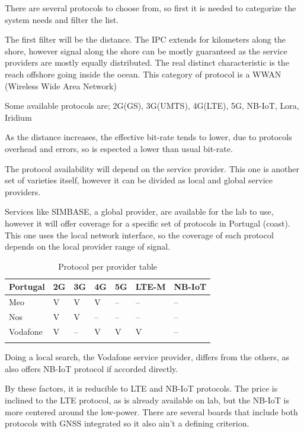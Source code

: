 There are several protocols to choose from, so first it is needed to categorize the 
system needs and filter the list.

The first filter will be the distance. The IPC extends for kilometers along the shore, 
however signal along the shore can be mostly guaranteed as the service providers are 
mostly equally distributed. The real distinct characteristic is the reach offshore 
going inside the ocean. This category of protocol is a WWAN (Wireless Wide Area Network)

Some available protocols are; 2G(GS), 3G(UMTS), 4G(LTE), 5G, NB-IoT, Lora, Iridium

As the distance increases, the effective bit-rate tends to lower, due to protocols 
overhead and errors, so is espected a lower than usual bit-rate.

The protocol availability will depend on the service provider. This one is another set of
varieties itself, however it can be divided as local and global service providers. 

Services like SIMBASE, a global provider, are available for the lab to use, however it will offer coverage for 
a specific set of protocols in Portugal (coast). This one uses the local network interface,
so the coverage of each protocol depends on the local provider range of signal.

\begin{table}[h!]
    \centering
    \begin{tabular}{l|l|l|l|l|l|l}
        \textbf{Portugal} & \textbf{2G} & \textbf{3G} & \textbf{4G} & \textbf{5G} & \textbf{LTE-M} & \textbf{NB-IoT} \\
        \hline
        \arrayrulecolor[gray]{0.85}
        Meo      & V  & V  & V  & -- & -- & -- \\
        \hline
        Nos      & V  & V  & -- & -- & -- & -- \\
        \hline
        Vodafone & V  & -- & V  & V  & V  & -- \\
        \arrayrulecolor{black}
    \end{tabular}
    \caption{Protocol per provider table}
    \label{table:protocol_per_provider}
\end{table}


Doing a local search, the Vodafone service provider, differs from the others, as
also offers NB-IoT protocol if accorded directly.

By these factors, it is reducible to LTE and NB-IoT protocols. The price is inclined to
the LTE protocol, as is already available on lab, but the NB-IoT is more centered 
around the low-power. There are several boards that include both protocols with GNSS 
integrated so it also ain't a defining criterion.

